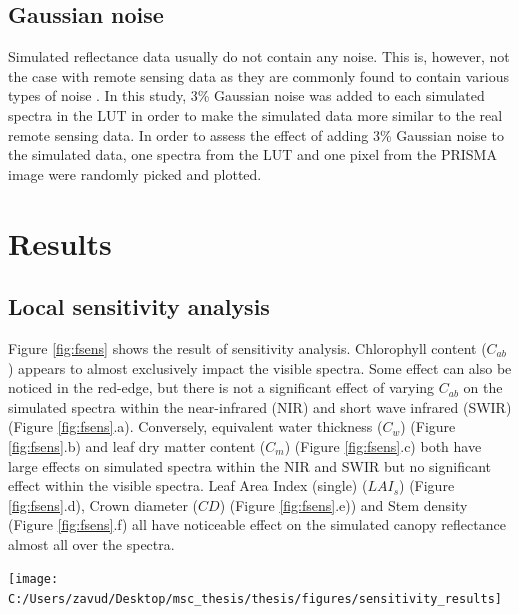 \documentclass[a4paper, nobind]{templates/ociamthesis}
\let\origfigure\figure
\let\endorigfigure\endfigure
\renewenvironment{figure}[1][2] {
    \expandafter\origfigure\expandafter[H]
} {
    \endorigfigure
}
\begin{document}
\hypertarget{gaussian-noise}{%
\section{Gaussian noise}\label{gaussian-noise}}

Simulated reflectance data usually do not contain any noise. This is, however, not the case with remote sensing data as they are commonly found to contain various types of noise \citep{rivera2017hyperspectral}. In this study, 3\% Gaussian noise was added to each simulated spectra in the LUT in order to make the simulated data more similar to the real remote sensing data. In order to assess the effect of adding 3\% Gaussian noise to the simulated data, one spectra from the LUT and one pixel from the PRISMA image were randomly picked and plotted.

\hypertarget{results}{%
\chapter{Results}\label{results}}

\hypertarget{local-sensitivity-analysis-1}{%
\section{Local sensitivity analysis}\label{local-sensitivity-analysis-1}}

Figure \ref{fig:fsens} shows the result of sensitivity analysis. Chlorophyll content (\(C_{ab}\)) appears to almost exclusively impact the visible spectra. Some effect can also be noticed in the red-edge, but there is not a significant effect of varying \(C_{ab}\) on the simulated spectra within the near-infrared (NIR) and short wave infrared (SWIR) (Figure \ref{fig:fsens}.a). Conversely, equivalent water thickness (\(C_{w}\)) (Figure \ref{fig:fsens}.b) and leaf dry matter content (\(C_{m}\)) (Figure \ref{fig:fsens}.c) both have large effects on simulated spectra within the NIR and SWIR but no significant effect within the visible spectra. Leaf Area Index (single) (\(LAI_{s}\)) (Figure \ref{fig:fsens}.d), Crown diameter (\(CD\)) (Figure \ref{fig:fsens}.e)) and Stem density (Figure \ref{fig:fsens}.f) all have noticeable effect on the simulated canopy reflectance almost all over the spectra.

\newpage

\begin{figure}

{\centering \texttt{[image: C:/Users/zavud/Desktop/msc\_thesis/thesis/figures/sensitivity\_results]} 

}

\caption{Effects of varying the chosen parameters on the simulated spectra}\label{fig:fsens}
\end{figure}
\end{document}
